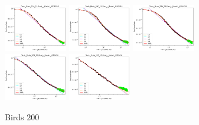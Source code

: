 \documentclass{article} %
\begin{document}
\begin{figure}[!htb]
\includegraphics[width=0.245\textwidth]{figures/scaling_laws_benchmark_dataset_plots__all_functional_forms/birds_25___BiT_101_3.png}
\includegraphics[width=0.245\textwidth]{figures/scaling_laws_benchmark_dataset_plots__all_functional_forms/birds_25___MiX_B_16.png}
\includegraphics[width=0.245\textwidth]{figures/scaling_laws_benchmark_dataset_plots__all_functional_forms/birds_25___MiX_L_16.png}
\includegraphics[width=0.245\textwidth]{figures/scaling_laws_benchmark_dataset_plots__all_functional_forms/birds_25___ViT_B_16.png}
\includegraphics[width=0.245\textwidth]{figures/scaling_laws_benchmark_dataset_plots__all_functional_forms/birds_25___ViT_S_16.png}
\caption{
    Birds 200
    }
    \label{fig:scaling_laws_benchmark_dataset_all_extrapolations__birds}
\end{figure}
\end{document}
